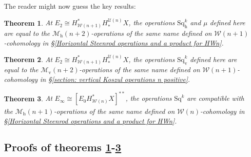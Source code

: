 \documentclass[11pt]{amsart} \renewcommand{\baselinestretch}{1.4}
\theoremstyle{plain}
\newtheorem{thm}{Theorem}[section]
\theoremstyle{definition}
\newcommand{\calU}{\mathcal{U}}
\newcommand{\calw}{\mathcal{W}}
\newcommand{\calMv}{\mathcal{M}\dver}
\newcommand{\calMh}{\mathcal{M}\dhor}
\newcommand{\Sq}{\mathrm{Sq}}
\newcommand{\Edown}[4]{[E_{#1}#2]^{#3}_{#4}}
\newcommand{\dver}{_\mathrm{v}}
\newcommand{\dhor}{_\mathrm{h}}
\newcommand{\Sqh}{\mathrm{Sq}\dhor}
\newcommand{\Sqv}{\mathrm{Sq}\dver}
\begin{document}
\begin{Operations in composite functor spectral sequences}
The reader might now guess the key results:
\begin{thm}
\label{E2CompFuncLieOperationsID}
At $E_2\cong H^*_{\calw(n+1)}H_*^{\calU(n)}X$, the operations $\Sqh^k$ and $\mu$ defined here are equal to the $\calMh(n+2)$-operations of the same name defined on $\calw(n+1)$-cohomology in
\S\ref{Horizontal Steenrod operations and a product for HWn}.
\end{thm}
\begin{thm}
\label{E2CompFuncKosOperationsID}
At $E_2\cong H^*_{\calw(n+1)}H_*^{\calU(n)}X$, the operations $\Sqv^k$ defined here are equal to the $\calMv(n+2)$-operations of the same name defined on $\calw(n+1)$-cohomology in
\S\ref{section: vertical Koszul operations n positive}.
\end{thm}
\begin{thm}
\label{EInftyCompFuncOperationsID}
At $E_\infty \cong \Edown{0}{H^*_{\calw(n)}X}{**}{}$, the operations $\Sq^k$ are compatible with the
$\calMh(n+1)$-operations of the same name defined on $\calw(n)$-cohomology in
\S\ref{Horizontal Steenrod operations and a product for HWn}.
%
\end{thm} 
\subsection{Proofs of theorems \ref{E2CompFuncLieOperationsID}-\ref{EInftyCompFuncOperationsID}}


\end{Operations in composite functor spectral sequences}
\end{document}
